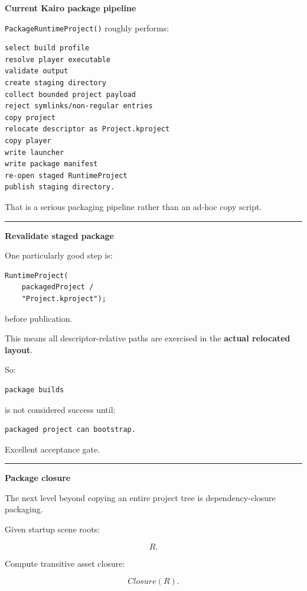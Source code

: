 \textbf{Current Kairo package pipeline}

\texttt{PackageRuntimeProject()} roughly performs:

\begin{verbatim}
select build profile
resolve player executable
validate output
create staging directory
collect bounded project payload
reject symlinks/non-regular entries
copy project
relocate descriptor as Project.kproject
copy player
write launcher
write package manifest
re-open staged RuntimeProject
publish staging directory.
\end{verbatim}

That is a serious packaging pipeline rather than an ad-hoc copy script.

\begin{center}\rule{0.5\linewidth}{0.5pt}\end{center}

\textbf{Revalidate staged package}

One particularly good step is:

\begin{verbatim}
RuntimeProject(
    packagedProject /
    "Project.kproject");
\end{verbatim}

before publication.

This means all descriptor-relative paths are exercised in the \textbf{actual relocated layout}.

So:

\begin{verbatim}
package builds
\end{verbatim}

is not considered success until:

\begin{verbatim}
packaged project can bootstrap.
\end{verbatim}

Excellent acceptance gate.

\begin{center}\rule{0.5\linewidth}{0.5pt}\end{center}

\textbf{Package closure}

The next level beyond copying an entire project tree is dependency-closure packaging.

Given startup scene roots:

\[
R.
\]

Compute transitive asset closure:

\[
Closure(R).
\]


